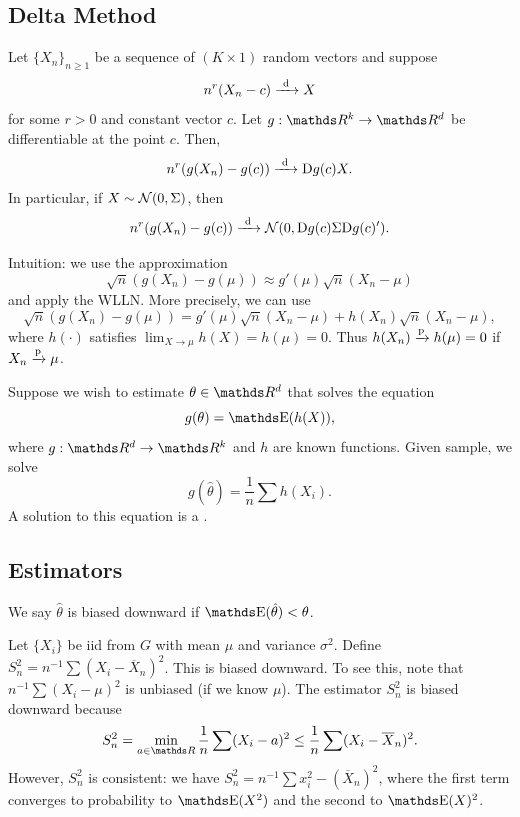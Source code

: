 \documentclass[letterpaper, 10pt]{article}
\begin{document}
\subsection{Delta Method}
\begin{theorem}
  Let \(\{X_n\}_{n \geq 1}\) be a sequence of \((K \times 1)\) random vectors and suppose
  \[
    n^r (X_n - c) \xrightarrow{\ \mathrm{d}\ } X
  \]
  for some \(r > 0\) and constant vector \(c\).
  Let \(g: \RR^k \to \RR^d\) be differentiable at the point \(c\).
  Then,
  \[
    n^r (g(X_n) - g(c)) \xrightarrow{\ \mathrm{d}\ } \mathrm{D} g(c) X.
  \]
  In particular, if \(X \sim \mathcal{N}(0, \Sigma)\), then
  \[
    n^r (g(X_n) - g(c)) \xrightarrow{\ \mathrm{d}\ } \mathcal{N}(0, \mathrm{D} g(c) \Sigma \mathrm{D} g(c)').
  \]
\end{theorem}
\begin{remark}
  Intuition:
  we use the approximation
  \[
    \sqrt{n} \left( g(X_n) - g(\mu) \right)
    \approx g'(\mu) \sqrt{n} (X_n - \mu)
  \]
  and apply the WLLN.
  More precisely, we can use
  \[
    \sqrt{n} \left(g(X_n) - g(\mu) \right)
    = g'(\mu) \sqrt{n} (X_n - \mu) + h(X_n) \sqrt{n} (X_n - \mu),
  \]
  where \(h(\cdot)\) satisfies \(\lim_{X \to \mu} h(X) = h(\mu) = 0\).
  Thus \(h(X_n) \xrightarrow{\mathrm{p}} h(\mu) = 0\) if \(X_n \xrightarrow{\mathrm{p}} \mu\).
\end{remark}
\begin{example}
  Suppose we wish to estimate \(\theta \in \RR^d\) that solves the equation
  \[
    g(\theta) = \E(h(X)),
  \]
  where \(g: \RR^d \to \RR^k\) and \(h\) are known functions.
  Given sample, we solve
  \[
    g(\hat{\theta}) = \frac{1}{n} \sum h(X_i).
  \]
  A solution to this equation is a .
\end{example}



\subsection{Estimators}
\begin{definition}
  We say \(\hat{\theta}\) is biased downward if \(\E(\hat{\theta}) < \theta\).
\end{definition}
\begin{example}
  Let \(\{X_i\}\) be iid from \(G\) with mean \(\mu\) and variance \(\sigma^2\).
  Define \(S_n^2 = n^{-1} \sum (X_i - \overline{X}_n)^2\).
  This is biased downward.
  To see this, note that \(n^{-1} \sum (X_i - \mu)^2\) is unbiased (if we know \(\mu\)).
  The estimator \(S_n^2\) is biased downward because
  \[
    S_n^2
    = \min_{a \in \RR} \frac{1}{n} \sum (X_i - a)^2
    \leq \frac{1}{n} \sum (X_i - \overline{X}_n)^2.
  \]
  However, \(S_n^2\) is consistent:
  we have \(S_n^2 = n^{-1} \sum x_i^2 - (\overline{X}_n)^2\), where the first term converges to probability to \(\E(X^2)\) and the second to \(\E(X)^2\).
\end{example}
\end{document}
